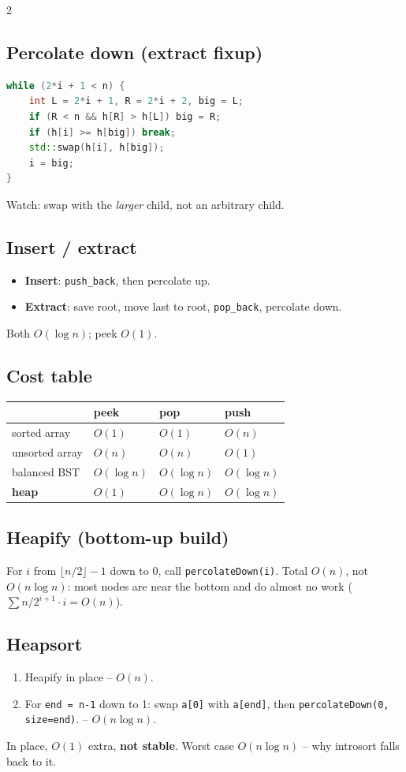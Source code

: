 \documentclass[10pt]{article}
\begin{document}
\begin{multicols}{2}
\subsection*{Percolate down (extract fixup)}
\begin{lstlisting}[language=C++]
while (2*i + 1 < n) {
    int L = 2*i + 1, R = 2*i + 2, big = L;
    if (R < n && h[R] > h[L]) big = R;
    if (h[i] >= h[big]) break;
    std::swap(h[i], h[big]);
    i = big;
}
\end{lstlisting}
Watch: swap with the \emph{larger} child, not an arbitrary child.

\subsection*{Insert / extract}
\begin{itemize}
    \item \textbf{Insert}: \texttt{push\_back}, then percolate up.
    \item \textbf{Extract}: save root, move last to root,
        \texttt{pop\_back}, percolate down.
\end{itemize}
Both $O(\log n)$; peek $O(1)$.

\columnbreak

\subsection*{Cost table}
\begin{tabular}{@{}l|lll@{}}
               & peek  & pop          & push\\
\hline
sorted array   & $O(1)$& $O(1)$       & $O(n)$\\
unsorted array & $O(n)$& $O(n)$       & $O(1)$\\
balanced BST   & $O(\log n)$ & $O(\log n)$ & $O(\log n)$\\
\textbf{heap}  & $O(1)$ & $O(\log n)$ & $O(\log n)$
\end{tabular}

\subsection*{Heapify (bottom-up build)}
For $i$ from $\lfloor n/2 \rfloor - 1$ down to $0$, call
\texttt{percolateDown(i)}. Total $O(n)$, not $O(n \log n)$:
most nodes are near the bottom and do almost no work
($\sum n/2^{i+1} \cdot i = O(n)$).

\subsection*{Heapsort}
\begin{enumerate}
    \item Heapify in place -- $O(n)$.
    \item For \texttt{end = n-1} down to 1: swap
    \texttt{a[0]} with \texttt{a[end]}, then
    \texttt{percolateDown(0, size=end)}. -- $O(n \log n)$.
\end{enumerate}
In place, $O(1)$ extra, \textbf{not stable}. Worst case
$O(n \log n)$ -- why introsort falls back to it.


\end{multicols}
\end{document}
